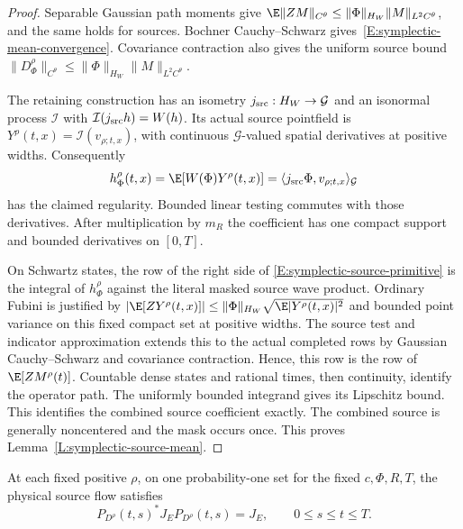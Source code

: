 \begin{proof}
  Separable Gaussian path moments give
  $\E\|ZM\|_{C^\theta}\le\|\Phi\|_{H_W}\|M\|_{L^2C^\theta}$,
  and the same holds for sources.
  Bochner Cauchy--Schwarz gives~\eqref{E:symplectic-mean-convergence}.
  Covariance contraction also gives the uniform source bound
  $\|D_\Phi^\rho\|_{C^\theta}
  \le\|\Phi\|_{H_W}\|M\|_{L^2C^\theta}$.

  The retaining construction has an isometry
  $j_{\rm src}:H_W\to\mathcal G$ and an isonormal process
  $\mathcal I$ with $\mathcal I(j_{\rm src}h)=W(h)$.
  Its actual source pointfield is $Y^\rho(t,x)=\mathcal I(v_{\rho;t,x})$,
  with continuous $\mathcal G$-valued spatial derivatives at positive widths.
  Consequently
  \[
    h_\Phi^\rho(t,x)=\E[W(\Phi)Y^\rho(t,x)]
    =\langle j_{\rm src}\Phi,v_{\rho;t,x}\rangle_{\mathcal G}
  \]
  has the claimed regularity. Bounded linear testing commutes
  with those derivatives. After multiplication by $m_R$ the
  coefficient has one compact support and bounded derivatives on $[0,T]$.

  On Schwartz states, the row of the right side of
  \eqref{E:symplectic-source-primitive} is the integral of
  $h_\Phi^\rho$ against the literal masked source wave product.
  Ordinary Fubini is justified by
  $|\E[ZY^\rho(t,x)]|\le\|\Phi\|_{H_W}
  \sqrt{\E|Y^\rho(t,x)|^2}$ and bounded point variance
  on this fixed compact set at positive widths.
  The source test and indicator approximation extends this to
  the actual completed rows by Gaussian Cauchy--Schwarz and
  covariance contraction. Hence, this row is the row of
  $\E[ZM^\rho(t)]$.
  Countable dense states and rational times, then continuity,
  identify the operator path.
  The uniformly bounded integrand gives its Lipschitz bound.
  This identifies the combined source coefficient exactly.
  The combined source is generally noncentered and the mask occurs once.
  This proves Lemma~\ref{L:symplectic-source-mean}.
\end{proof}

\begin{proposition}\label{P:symplectic-source}
  At each fixed positive $\rho$, on one probability-one set for
  the fixed $c,\Phi,R,T$, the physical source flow satisfies
  \[
    P_{D^\rho}(t,s)^*J_EP_{D^\rho}(t,s)=J_E,
    \qquad 0\le s\le t\le T .
  \]
\end{proposition}

